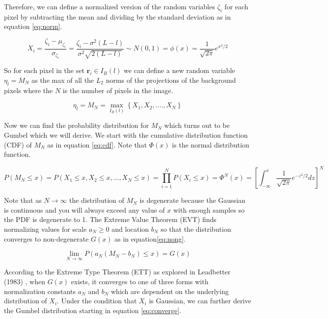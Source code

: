 \documentclass[paper=a4, fontsize=11pt]{article} %
\begin{document}
Therefore, we can define a normalized version of the random variables \(\zeta_i\) for each pixel by subtracting the mean and dividing by the standard deviation as in equation \ref{eq:norm}.

\begin{equation}
\label{eq:norm}
X_i= \frac{\zeta_i - \mu_{\zeta_i}}{\sigma_{\zeta_i}} = \frac{\zeta_i - \sigma^2(L-l)}{\sigma^2\sqrt{2(L-l)}} \sim N(0, 1) = \phi(x) = \frac{1}{\sqrt{2\pi}}e^{x^2/2}
\end{equation}

So for each pixel in the set \(\textbf{r}_i \in I_{B}(l)\) we can define a new random variable \(\eta_l = M_N\) as the max of all the \(L_2\) norms of the projections of the background pixels where the \(N\) is the number of pixels in the image.

\begin{equation}
\label{eq:max_x}
\eta_l = M_N = \max_{I_B(l)}\left\{X_1, X_2, ...., X_{N}\right\}
\end{equation}

Now we can find the probability distribution for \(M_N\) which turns out to be Gumbel which we will derive. We start with the cumulative distribution function (CDF) of \(M_N\) as in equation \ref{eq:cdf}. Note that \(\Phi(x)\) is the normal distribution function.

\begin{equation}
\label{eq:cdf}
P(M_N \le x) = P(X_1 \le x, X_2 \le x, ..., X_N \le x) = \prod_{i=1}^N P(X_i \le x) = \Phi^N(x) = \left[\int_{-\infty}^x\frac{1}{\sqrt{2\pi}}e^{-z^2/2}dz\right]^N
\end{equation}

Note that as \(N \rightarrow \infty\) the distribution of \(M_N\) is degenerate because the Gaussian is continuous and you will always exceed any value of \(x\) with enough samples so the PDF is degenerate to 1. The Extreme Value Theorem (EVT) finds normalizing values for scale \(a_N \ge 0\) and location \(b_N\) so that the distribution converges to non-degenerate \(G(x)\) as in equation\ref{eq:nong}.

\begin{equation}
\label{eq:nong}
\lim_{N\rightarrow\infty}P\left(a_N(M_N-b_N) \le x\right) = G(x) 
\end{equation}

According to the Extreme Type Theorem (ETT) as explored in Leadbetter (1983) \cite{leadbetter}, when \(G(x)\) exists, it converges to one of three forms with normalization constants \(a_N\) and \(b_N\) which are dependent on the underlying distribution of \(X_i\). Under the condition that \(X_i\) is Gaussian, we can further derive the Gumbel distribution starting in equation \ref{eq:converge}.
\end{document}

